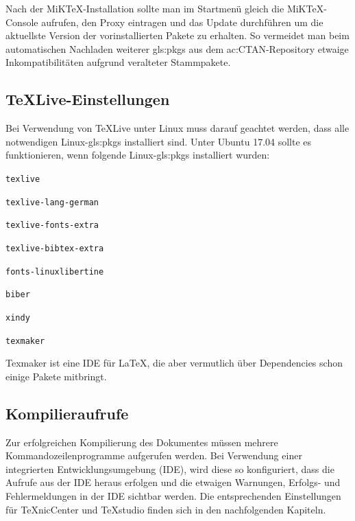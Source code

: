 Nach der MiKTeX-Installation sollte man im Startmenü gleich die MiKTeX-Console aufrufen, den Proxy eintragen und das Update durchführen um die aktuellste Version der vorinstallierten Pakete zu erhalten.
So vermeidet man beim automatischen Nachladen weiterer \glspl{gls:pkg} aus dem \acrshort{ac:CTAN}-Repository etwaige Inkompatibilitäten aufgrund veralteter Stammpakete.


\subsection{TeXLive-Einstellungen}
\label{sec:TeXLive}
Bei Verwendung von TeXLive unter Linux muss darauf geachtet werden, dass alle notwendigen Linux-\glspl{gls:pkg} installiert sind.
Unter Ubuntu 17.04 sollte es funktionieren, wenn folgende Linux-\glspl{gls:pkg} installiert wurden:
\begin{itemize*}
	\item {\small\verb#texlive#}
	\item {\small\verb#texlive-lang-german#}
	\item {\small\verb#texlive-fonts-extra#}
	\item {\small\verb#texlive-bibtex-extra#}
	\item {\small\verb#fonts-linuxlibertine#}
	\item {\small\verb#biber#}
	\item {\small\verb#xindy#}
	\item {\small\verb#texmaker#}
\end{itemize*}
Texmaker ist eine IDE für \LaTeX, die aber vermutlich über Dependencies schon einige Pakete mitbringt.


\subsection{Kompilieraufrufe}
\label{sec:Aufruf}
Zur erfolgreichen Kompilierung des Dokumentes müssen mehrere
Kommandozeilenprogramme aufgerufen werden.
Bei Verwendung einer integrierten Entwicklungsumgebung (IDE),
wird diese so konfiguriert, dass die Aufrufe aus der IDE heraus erfolgen und
die etwaigen Warnungen, Erfolgs- und Fehlermeldungen in der IDE sichtbar werden.
Die entsprechenden Einstellungen für TeXnicCenter und TeXstudio finden sich
in den nachfolgenden Kapiteln.

